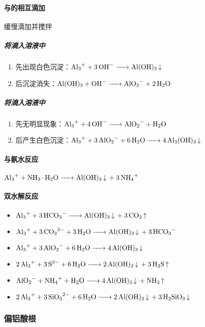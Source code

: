 \documentclass[a4paper]{article}
\begin{document}
	\paragraph{与的相互滴加}
	缓慢滴加并搅拌
	\subparagraph{将滴入溶液中}
	\begin{enumerate}
		\item 先出现白色沉淀：$\ce{Al3+ + 3OH- -> Al(OH)3 v}\\$
		\item 后沉淀消失：$\ce{Al(OH)3 + OH- -> AlO2- + 2H2O}\\$
	\end{enumerate}
	\subparagraph{将滴入溶液中}
	\begin{enumerate}
		\item 先无明显现象：$\ce{Al3+ + 4OH- -> AlO2- + H2O}\\$
		\item 后产生白色沉淀：$\ce{Al3+ + 3AlO2- + 6H2O -> 4Al3(OH)3 v}\\$
	\end{enumerate}
	\paragraph{与氨水反应}
	$\ce{Al3+ + NH3*H2O -> Al(OH)3 v + 3NH4+}\\$
	\paragraph{双水解反应}
	\begin{itemize}
		\item $\ce{Al3+ + 3HCO3- -> Al(OH)3 v + 3CO2 ^}$
		\item $\ce{Al3+ + 3CO3^2- + 3H2O -> Al(OH)3 v + 3HCO3-}$
		\item $\ce{Al3+ + 3AlO2- + 6H2O -> 4Al(OH)3 v}$
		\item $\ce{2Al3+ + 3S^2- + 6H2O -> 2Al(OH)3 v + 3H2S ^}$
		\item $\ce{AlO2- + NH4+ + H2O -> 4Al(OH)3 v + NH3 ^}$
		\item $\ce{2Al3+ + 3SiO3^2- + 6H2O -> 2Al(OH)3 v + 3H2SiO3 v}$
	\end{itemize}
	

	\subsubsection{偏铝酸根}
\end{document}

